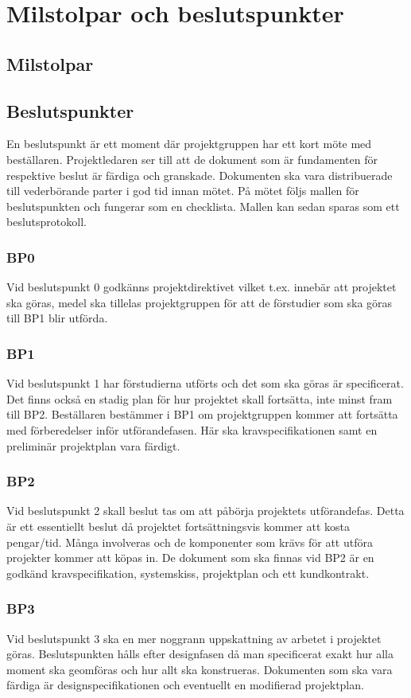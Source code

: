 \documentclass[projektplan/plan.tex]{subfiles}
\begin{document}
\section{Milstolpar och beslutspunkter}
\subsection{Milstolpar}
\subsection{Beslutspunkter}
En beslutspunkt är ett moment där projektgruppen har ett kort möte med
beställaren. Projektledaren ser till att de dokument som är fundamenten för
respektive beslut är färdiga och granskade. Dokumenten ska vara distribuerade
till vederbörande parter i god tid innan mötet. På mötet följs mallen för
beslutspunkten och fungerar som en checklista. Mallen kan sedan sparas som ett
beslutsprotokoll.

\subsubsection*{BP0} Vid beslutspunkt 0 godkänns projektdirektivet vilket t.ex. innebär att
projektet ska göras, medel ska tillelas projektgruppen för att de förstudier
som ska göras till  BP1 blir utförda.

\subsubsection*{BP1} 
Vid beslutspunkt 1 har förstudierna utförts och det som ska göras är specificerat. Det
finns också en stadig plan för hur projektet skall fortsätta, inte minst fram
till BP2. Beställaren bestämmer i BP1 om projektgruppen kommer att fortsätta
med förberedelser inför utförandefasen. Här ska kravspecifikationen samt en
preliminär projektplan vara färdigt.

\subsubsection*{BP2}
Vid beslutspunkt 2 skall beslut tas om att påbörja projektets utförandefas. Detta är ett
essentiellt beslut då projektet fortsättningsvis kommer att kosta pengar/tid.
Många involveras och de komponenter som krävs för att utföra projekter kommer
att köpas in. De dokument som ska finnas vid BP2 är en godkänd
kravspecifikation, systemskiss, projektplan och ett kundkontrakt.

\subsubsection*{BP3}
Vid beslutspunkt 3 ska en mer noggrann uppskattning av arbetet i projektet
göras. Beslutspunkten hålls efter designfasen då man specificerat exakt hur
alla moment ska geomföras och hur allt ska konstrueras. Dokumenten som ska vara
färdiga är designspecifikationen och eventuellt en modifierad projektplan.
\end{document}
